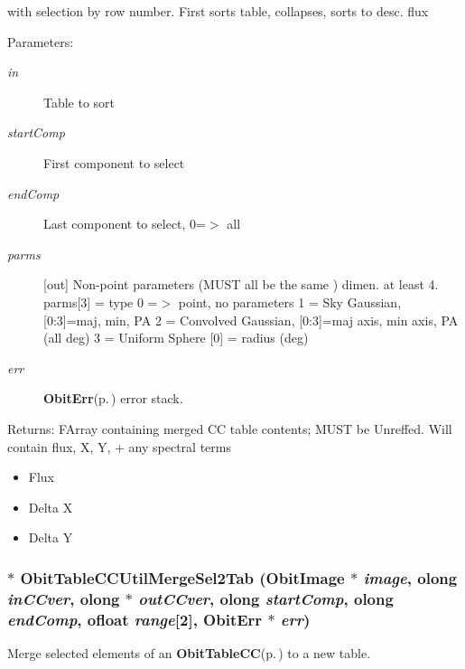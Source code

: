 with selection by row number. First sorts table, collapses, sorts to desc. flux \begin{Desc}
\item[Parameters:]
\begin{description}
\item[{\em in}]Table to sort \item[{\em start\-Comp}]First component to select \item[{\em end\-Comp}]Last component to select, 0=$>$ all \item[{\em parms}][out] Non-point parameters (MUST all be the same ) dimen. at least 4. parms[3] = type 0 =$>$ point, no parameters 1 = Sky Gaussian, [0:3]=maj, min, PA 2 = Convolved Gaussian, [0:3]=maj axis, min axis, PA (all deg) 3 = Uniform Sphere [0] = radius (deg) \item[{\em err}]{\bf Obit\-Err}{\rm (p.\,\pageref{structObitErr})} error stack. \end{description}
\end{Desc}
\begin{Desc}
\item[Returns:]FArray containing merged CC table contents; MUST be Unreffed. Will contain flux, X, Y, + any spectral terms \begin{itemize}
\item Flux \item Delta X \item Delta Y \end{itemize}
\end{Desc}
\subsubsection{$\ast$ Obit\-Table\-CCUtil\-Merge\-Sel2Tab ({\bf Obit\-Image} $\ast$ {\em image}, {\bf olong} {\em in\-CCver}, {\bf olong} $\ast$ {\em out\-CCver}, {\bf olong} {\em start\-Comp}, {\bf olong} {\em end\-Comp}, {\bf ofloat} {\em range}[2], {\bf Obit\-Err} $\ast$ {\em err})}\label{ObitTableCCUtil_8c_a10}


Merge selected elements of an {\bf Obit\-Table\-CC}{\rm (p.\,\pageref{structObitTableCC})} to a new table. 

